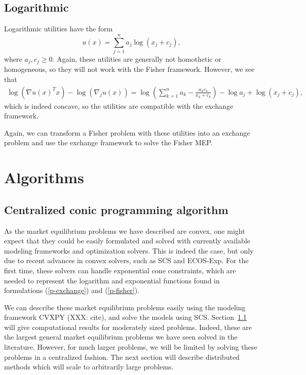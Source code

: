 \documentclass[12pt]{article}
\begin{document}
\subsection{Logarithmic}
Logarithmic utilities have the form
\[
u(x) = \sum_{j=1}^n a_j \log(x_j+ c_j),
\]
where $a_j, c_j \geq 0$.
Again, these utilities are generally not homothetic or
homogeneous, so they will not work with the Fisher framework.
However, we see that 
\begin{align*}
\log(\nabla u(x)^T x) - \log(\nabla_j u(x)) =
\log\left(\sum_{k=1}^n a_k - \frac{a_k c_k}{x_k+c_k} \right) - \log a_j + \log (x_j + c_j),
\end{align*}
which is indeed concave, so the utilities are compatible
with the exchange framework.

Again, we can transform a Fisher problem with these utilities into
an exchange problem and use the exchange framework to solve
the Fisher MEP.

\section{Algorithms}
\subsection{Centralized conic programming algorithm}
\label{sec:centralized}

As the market equilibrium problems we have described are convex, one might expect that they could be easily formulated and solved with currently
available modeling frameworks and optimization solvers.
This is indeed the case, but only due to recent advances in convex solvers,
such as SCS and ECOS-Exp. %
For the first time, these solvers can handle exponential cone constraints,
which are needed to represent the logarithm and exponential functions found in 
formulations (\ref{p-exchange}) and (\ref{p-fisher}).

We can describe these market equilibrium problems easily using the modeling
framework CVXPY (XXX: cite), and solve the models using SCS. Section~\ref{sec:centralized} will give computational results for moderately sized problems. Indeed, these are the largest general market equilibrium problems we have seen solved in the literature. However, for much larger problems, we will
be limited by solving these problems in a centralized fashion. The next section will describe distributed methods which will scale to arbitrarily large problems.
\end{document}
